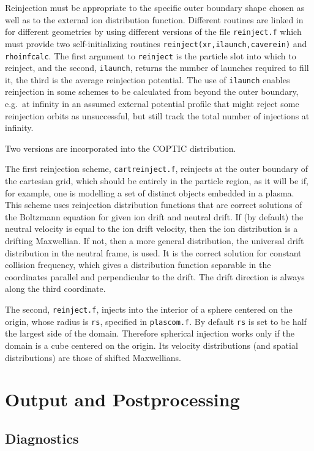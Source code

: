 \documentclass[12pt]{article}
\begin{document}
Reinjection must be appropriate to the specific outer boundary shape
chosen as well as to the external ion distribution function. Different
routines are linked in for different geometries by using different
versions of the file \verb!reinject.f! which must provide two
self-initializing routines \verb!reinject(xr,ilaunch,caverein)! and
\verb!rhoinfcalc!. The first argument to \verb!reinject! is the
particle slot into which to reinject, and the second, \verb!ilaunch!,
returns the number of launches required to fill it, the third is the
average reinjection potential. The use of \verb!ilaunch! enables
reinjection in some schemes to be calculated from beyond the outer
boundary, e.g.\ at infinity in an assumed external potential profile
that might reject some reinjection orbits as unsuccessful, but still
track the total number of injections at infinity.

Two versions are incorporated into the COPTIC distribution. 

The first reinjection scheme,
\verb!cartreinject.f!, reinjects at the outer boundary of the
cartesian grid, which should be entirely in the particle region, as it
will be if, for example, one is modelling a set of distinct objects
embedded in a plasma. This scheme uses reinjection distribution
functions that are correct solutions of the Boltzmann equation for
given ion drift and neutral drift. If (by default) the neutral
velocity is equal to the ion drift velocity, then the ion distribution
is a drifting Maxwellian. If not, then a more general distribution,
the universal drift distribution in the neutral frame, is used. It is
the correct solution for constant collision frequency, which gives a
distribution function separable in the coordinates parallel and
perpendicular to the drift. The drift direction is always along the
third coordinate.

The second, \verb!reinject.f!, injects into the
interior of a sphere centered on the origin, whose radius is
\verb!rs!, specified in \verb!plascom.f!. By default \verb!rs! is set
to be half the largest side of the domain. Therefore spherical
injection works only if the domain is a cube centered on the origin.
Its velocity distributions (and spatial distributions) are those of
shifted Maxwellians.

\section{Output and Postprocessing}

\subsection{Diagnostics}
\end{document}
